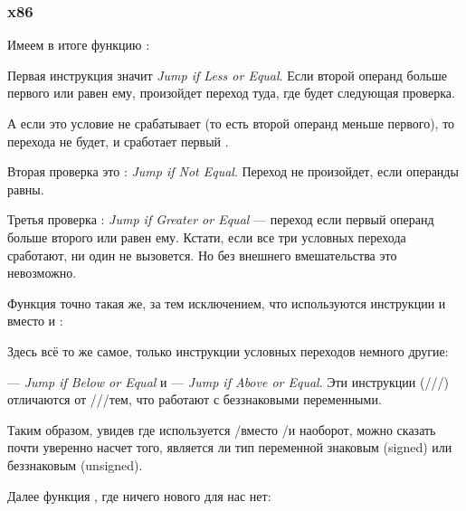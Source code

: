 \subsubsection{x86}


Имеем в итоге функцию :



Первая инструкция \JLE значит \emph{Jump if Less or Equal}. 
Если второй операнд больше первого или равен ему, произойдет переход туда, где будет следующая проверка.

А если это условие не срабатывает (то есть второй операнд меньше первого), то перехода не будет, 
и сработает первый \printf.

Вторая проверка это \JNE: \emph{Jump if Not Equal}.
Переход не произойдет, если операнды равны.

Третья проверка \JGE: \emph{Jump if Greater or Equal} --- переход 
если первый операнд больше второго или равен ему.
Кстати, если все три условных перехода сработают, ни один \printf не вызовется. 
Но без внешнего вмешательства это невозможно.

Функция  точно такая же, за тем исключением, что используются инструкции 
\JBE и \JAE вместо \JLE и \JGE:



Здесь всё то же самое, только инструкции условных переходов немного другие:

\JBE --- \emph{Jump if Below or Equal} и \JAE --- \emph{Jump if Above or Equal}.
Эти инструкции (/\JAE/\JB/\JBE) 
отличаются от \JG/\JGE/\JL/\JLE тем, что работают с беззнаковыми переменными.

Таким образом, увидев где используется \JG/\JL вместо /\JB и наоборот, 
можно сказать почти уверенно насчет того, 
является ли тип переменной знаковым (signed) или беззнаковым (unsigned).

Далее функция \main, где ничего нового для нас нет:

